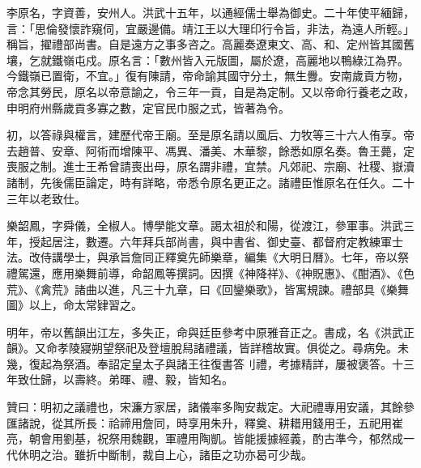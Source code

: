 \begin{pinyinscope}
李原名，字資善，安州人。洪武十五年，以通經儒士舉為御史。二十年使平緬歸，言：「思倫發懷詐窺伺，宜嚴邊備。靖江王以大理印行令旨，非法，為遠人所輕。」稱旨，擢禮部尚書。自是遠方之事多咨之。高麗奏遼東文、高、和、定州皆其國舊壤，乞就鐵嶺屯戍。原名言：「數州皆入元版圖，屬於遼，高麗地以鴨綠江為界。今鐵嶺已置衛，不宜。」復有陳請，帝命諭其國守分土，無生釁。安南歲貢方物，帝念其勞民，原名以帝意諭之，令三年一貢，自是為定制。又以帝命行養老之政，申明府州縣歲貢多寡之數，定官民巾服之式，皆著為令。

初，以答祿與權言，建歷代帝王廟。至是原名請以風后、力牧等三十六人侑享。帝去趙普、安章、阿術而增陳平、馮異、潘美、木華黎，餘悉如原名奏。魯王薨，定喪服之制。進士王希曾請喪出母，原名謂非禮，宜禁。凡郊祀、宗廟、社稷、嶽瀆諸制，先後儒臣論定，時有詳略，帝悉令原名更正之。諸禮臣惟原名在任久。二十三年以老致仕。

樂韶鳳，字舜儀，全椒人。博學能文章。謁太祖於和陽，從渡江，參軍事。洪武三年，授起居注，數遷。六年拜兵部尚書，與中書省、御史臺、都督府定教練軍士法。改侍講學士，與承旨詹同正釋奠先師樂章，編集《大明日曆》。七年，帝以祭禮駕還，應用樂舞前導，命韶鳳等撰詞。因撰《神降祥》、《神貺惠》、《酣酒》、《色荒》、《禽荒》諸曲以進，凡三十九章，曰《回鑾樂歌》，皆寓規諫。禮部具《樂舞圖》以上，命太常肄習之。

明年，帝以舊韻出江左，多失正，命與廷臣參考中原雅音正之。書成，名《洪武正韻》。又命孝陵寢朔望祭祀及登壇脫舄諸禮議，皆詳稽故實。俱從之。尋病免。未幾，復起為祭酒。奉詔定皇太子與諸王往復書答刂禮，考據精詳，屢被褒答。十三年致仕歸，以壽終。弟暉、禮、毅，皆知名。

贊曰：明初之議禮也，宋濂方家居，諸儀率多陶安裁定。大祀禮專用安議，其餘參匯諸說，從其所長：祫禘用詹同，時享用朱升，釋奠、耕耤用錢用壬，五祀用崔亮，朝會用劉基，祝祭用魏觀，軍禮用陶凱。皆能援據經義，酌古準今，郁然成一代休明之治。雖折中斷制，裁自上心，諸臣之功亦曷可少哉。


\end{pinyinscope}